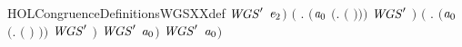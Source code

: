 \begin{SaveVerbatim}{HOLCongruenceDefinitionsWGSXXdef}
                      \ensuremath{\HOLBoundVar{WGS}\sp{\prime}} \ensuremath{\HOLBoundVar{e}\sb{\mathrm{2}}}\ensuremath{)} \HOLSymConst{\HOLTokenDisj{}}
                 \ensuremath{(}\HOLSymConst{\HOLTokenExists{}} . \ensuremath{(}\ensuremath{\HOLBoundVar{a}\sb{\mathrm{0}}} \HOLSymConst{\ensuremath{=}} \ensuremath{(}\HOLTokenLambda{}.   \ensuremath{(} \ensuremath{)}\ensuremath{)}\ensuremath{)} \HOLSymConst{\HOLTokenConj{}} \ensuremath{\HOLBoundVar{WGS}\sp{\prime}} \ensuremath{)} \HOLSymConst{\HOLTokenDisj{}}
                 \ensuremath{(}\HOLSymConst{\HOLTokenExists{}} . \ensuremath{(}\ensuremath{\HOLBoundVar{a}\sb{\mathrm{0}}} \HOLSymConst{\ensuremath{=}} \ensuremath{(}\HOLTokenLambda{}.  \ensuremath{(} \ensuremath{)} \ensuremath{)}\ensuremath{)} \HOLSymConst{\HOLTokenConj{}} \ensuremath{\HOLBoundVar{WGS}\sp{\prime}} \ensuremath{)} \HOLSymConst{\HOLTokenImp{}}
                 \ensuremath{\HOLBoundVar{WGS}\sp{\prime}} \ensuremath{\HOLBoundVar{a}\sb{\mathrm{0}}}\ensuremath{)} \HOLSymConst{\HOLTokenImp{}}
            \ensuremath{\HOLBoundVar{WGS}\sp{\prime}} \ensuremath{\HOLBoundVar{a}\sb{\mathrm{0}}}\ensuremath{)}
\end{SaveVerbatim}
\newcommand{\HOLCongruenceDefinitionsWGSXXdef}{\UseVerbatim{HOLCongruenceDefinitionsWGSXXdef}}
\newcommand{\HOLCongruenceDefinitions}{
\HOLDfnTag{Congruence}{CC_def}\HOLCongruenceDefinitionsCCXXdef
\HOLDfnTag{Congruence}{congruence}\HOLCongruenceDefinitionscongruence
\HOLDfnTag{Congruence}{congruence'}\HOLCongruenceDefinitionscongruenceYY
\HOLDfnTag{Congruence}{CONTEXT_def}\HOLCongruenceDefinitionsCONTEXTXXdef
\HOLDfnTag{Congruence}{GCC_def}\HOLCongruenceDefinitionsGCCXXdef
\HOLDfnTag{Congruence}{GCONTEXT_def}\HOLCongruenceDefinitionsGCONTEXTXXdef
\HOLDfnTag{Congruence}{GSEQ_def}\HOLCongruenceDefinitionsGSEQXXdef
\HOLDfnTag{Congruence}{IS_CONST_def}\HOLCongruenceDefinitionsISXXCONSTXXdef
\HOLDfnTag{Congruence}{OH_CONTEXT_def}\HOLCongruenceDefinitionsOHXXCONTEXTXXdef
\HOLDfnTag{Congruence}{precongruence}\HOLCongruenceDefinitionsprecongruence
\HOLDfnTag{Congruence}{precongruence'}\HOLCongruenceDefinitionsprecongruenceYY
\HOLDfnTag{Congruence}{SEQ_def}\HOLCongruenceDefinitionsSEQXXdef
\HOLDfnTag{Congruence}{SG_def}\HOLCongruenceDefinitionsSGXXdef
\HOLDfnTag{Congruence}{WG_def}\HOLCongruenceDefinitionsWGXXdef
\HOLDfnTag{Congruence}{WGS_def}\HOLCongruenceDefinitionsWGSXXdef
}
